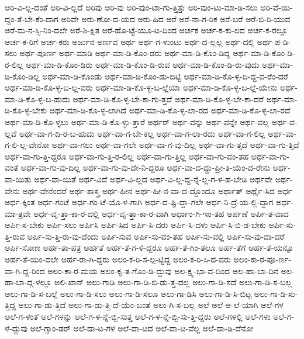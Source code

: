 {ಅರಿ-ವಿ-ಲ್ಲ-ದಂತೆ
ಅರಿ-ವಿ-ಲ್ಲದೆ
ಅರಿವು
ಅರಿ-ವು
ಅರಿ-ವುಂ-ಟಾ-ಗು-ತ್ತಿತ್ತು
ಅರಿ-ವುಂ-ಟು-ಮಾ-ಡಿ-ಸಲು
ಅರಿ-ವೆ-ಯಿ-ದ್ದಂ-ತೆ-ಬೇ-ಕೆಂ-ದಾಗ
ಅರಿವೇ
ಅರು-ಣೋ-ದ-ಯದ
ಅರು-ಹಿದ
ಅರೆ
ಅರೆ-ನಾ-ಗ-ರಿಕ
ಅರೆ-ಬರೆ
ಅರೆ-ಬಿ-ರಿ-ಯುವ
ಅರೆ-ಮ-ನ-ಸ್ಸಿ-ನಿಂ-ದಲೇ
ಅರೆ-ಶಿ-ಕ್ಷಿತ
ಅರೆ-ಹೊ-ಟ್ಟೆ-ಯೂ-ಟ-ದಿಂದ
ಅರ್ಚಕ
ಅರ್ಚ-ಕ-ಕು-ಲದ
ಅರ್ಚ-ಕ-ರಲ್ಲೂ
ಅರ್ಚ-ಕ-ರಿಗೆ
ಅರ್ಚ-ಕರು
ಅರ್ಜುನ
ಅರ್ಣವ
ಅರ್ಥ
ಅರ್ಥ-ಗ-ಳುಂಟು
ಅರ್ಥ-ದ-ಲ್ಲಲ್ಲ
ಅರ್ಥ-ದಲ್ಲಿ
ಅರ್ಥ-ಪ-ಡಿ-ಸಲು
ಅರ್ಥ-ಪೂರ್ಣ
ಅರ್ಥ-ಮಾಡಿ
ಅರ್ಥ-ಮಾ-ಡಿ-ಕೊಂ-ಡರು
ಅರ್ಥ-ಮಾ-ಡಿ-ಕೊಂ-ಡಿದ್ದ
ಅರ್ಥ-ಮಾ-ಡಿ-ಕೊಂ-ಡಿ-ರ-ಲಿಲ್ಲ
ಅರ್ಥ-ಮಾ-ಡಿ-ಕೊಂ-ಡಿರು
ಅರ್ಥ-ಮಾ-ಡಿ-ಕೊಂ-ಡಿ-ರುವ
ಅರ್ಥ-ಮಾ-ಡಿ-ಕೊಂ-ಡಿ-ರು-ವುದು
ಅರ್ಥ-ಮಾ-ಡಿ-ಕೊಂ-ಡಿಲ್ಲ
ಅರ್ಥ-ಮಾ-ಡಿ-ಕೊಂಡು
ಅರ್ಥ-ಮಾ-ಡಿ-ಕೊಂ-ಡು-ಬಿಟ್ಟಿ
ಅರ್ಥ-ಮಾ-ಡಿ-ಕೊ-ಳ್ಳ-ದಿ-ದ್ದ-ವ-ರೆಂ-ದರೆ
ಅರ್ಥ-ಮಾ-ಡಿ-ಕೊ-ಳ್ಳ-ಬ-ಲ್ಲ-ವರು
ಅರ್ಥ-ಮಾ-ಡಿ-ಕೊ-ಳ್ಳ-ಬ-ಲ್ಲೆಯಾ
ಅರ್ಥ-ಮಾ-ಡಿ-ಕೊ-ಳ್ಳ-ಬ-ಲ್ಲೆ-ಯೇನು
ಅರ್ಥ-ಮಾ-ಡಿ-ಕೊ-ಳ್ಳ-ಬ-ಹುದು
ಅರ್ಥ-ಮಾ-ಡಿ-ಕೊ-ಳ್ಳ-ಬೇ-ಕಾ-ಗು-ತ್ತದೆ
ಅರ್ಥ-ಮಾ-ಡಿ-ಕೊ-ಳ್ಳ-ಬೇ-ಕಾ-ದರೆ
ಅರ್ಥ-ಮಾ-ಡಿ-ಕೊ-ಳ್ಳ-ಬೇಕು
ಅರ್ಥ-ಮಾ-ಡಿ-ಕೊ-ಳ್ಳ-ಲಾಗಿದೆ
ಅರ್ಥ-ಮಾ-ಡಿ-ಕೊ-ಳ್ಳ-ಲಾ-ರದ
ಅರ್ಥ-ಮಾ-ಡಿ-ಕೊ-ಳ್ಳ-ಲಾ-ರದೆ
ಅರ್ಥ-ಮಾ-ಡಿ-ಕೊ-ಳ್ಳಲು
ಅರ್ಥ-ಮಾ-ಡಿ-ಕೊ-ಳ್ಳು-ತ್ತಾರೆ
ಅರ್ಥರ್
ಅರ್ಥ-ವನ್ನು
ಅರ್ಥ-ವನ್ನೇ
ಅರ್ಥ-ವಲ್ಲ
ಅರ್ಥ-ವ-ಲ್ಲವೆ
ಅರ್ಥ-ವಾ-ಗ-ದಿ-ರ-ಬ-ಹುದು
ಅರ್ಥ-ವಾ-ಗ-ಬೇ-ಕಲ್ಲ
ಅರ್ಥ-ವಾ-ಗ-ಲಾ-ರದು
ಅರ್ಥ-ವಾ-ಗ-ಲಿಲ್ಲ
ಅರ್ಥ-ವಾ-ಗ-ಲಿ-ಲ್ಲ-ವೇನೋ
ಅರ್ಥ-ವಾ-ಗಲು
ಅರ್ಥ-ವಾ-ಗಲೇ
ಅರ್ಥ-ವಾ-ಗ-ವು-ದಿಲ್ಲ
ಅರ್ಥ-ವಾ-ಗು-ತ್ತದೆ
ಅರ್ಥ-ವಾ-ಗು-ತ್ತಿದೆ
ಅರ್ಥ-ವಾ-ಗು-ತ್ತಿ-ದ್ದರೂ
ಅರ್ಥ-ವಾ-ಗು-ತ್ತಿ-ರ-ಲಿಲ್ಲ
ಅರ್ಥ-ವಾ-ಗು-ತ್ತಿಲ್ಲ
ಅರ್ಥ-ವಾ-ಗು-ವಂ-ತಹ
ಅರ್ಥ-ವಾ-ಗು-ವಂತೆ
ಅರ್ಥ-ವಾ-ಗು-ವು-ದಿಲ್ಲ
ಅರ್ಥ-ವಾ-ಗು-ವು-ದೇ-ನಿ-ದ್ದರೂ
ಅರ್ಥ-ವಾ-ದ-ದ್ದು-ಪ್ರೀ-ತಿ-ಯೆಂ-ದ-ರೇನು
ಅರ್ಥ-ವಾ-ಯಿತು
ಅರ್ಥ-ವಾ-ಯಿತೆ
ಅರ್ಥ-ವಿದೆ
ಅರ್ಥ-ವಿ-ಲ್ಲದ
ಅರ್ಥ-ವಿ-ಲ್ಲ-ದ್ದ-ನ್ನೆ-ಲ್ಲ-ಗ-ಳ-ಹ-ಬೇಡಿ
ಅರ್ಥವೇ
ಅರ್ಥ-ವೇನು
ಅರ್ಥ-ವೇನೆಂದರೆ
ಅರ್ಥ-ಶಾಸ್ತ್ರ
ಅರ್ಥ-ಹೀನ
ಅರ್ಥ-ಹೀ-ನ-ವಾ-ದ-ದ್ದೊಂದೂ
ಅರ್ಥಾತ್
ಅರ್ಥೈ-ಸಿದ
ಅರ್ಧ
ಅರ್ಧ-ಕ್ಕಿಂತ
ಅರ್ಧ-ಗಂಟೆ
ಅರ್ಧ-ಗಂ-ಟೆ-ಯೊ-ಳ-ಗಾಗಿ
ಅರ್ಧ-ದ-ಷ್ಟಿ-ದ್ದಾ-ಗಲೇ
ಅರ್ಧ-ನಿ-ದ್ರೆ-ಯ-ಲ್ಲಿ-ದ್ದಾಗ
ಅರ್ಧ-ಮಾ-ತ್ರವೇ
ಅರ್ಧ-ವೃ-ತ್ತಾ-ಕಾ-ರ-ದಲ್ಲಿ
ಅರ್ಧ-ವೃ-ತ್ತಾ-ಕಾ-ರ-ವಾಗಿ
ಅರ್ಧಾಂ-ಗಿ-ಇಂ-ತಹ
ಅರ್ಪಣೆ
ಅರ್ಪಿ-ತ-ವಾದ
ಅರ್ಪಿ-ಸ-ಬೇಕು
ಅರ್ಪಿ-ಸಲು
ಅರ್ಪಿಸಿ
ಅರ್ಪಿ-ಸಿದ
ಅರ್ಪಿ-ಸಿ-ದರು
ಅರ್ಪಿ-ಸಿ-ದಳು
ಅರ್ಪಿ-ಸಿ-ಬಿ-ಡ-ಬೇಕು
ಅರ್ಪಿ-ಸು-ತ್ತಿ-ರುವ
ಅರ್ಪಿ-ಸು-ತ್ತಿ-ರು-ವು-ದೆಂದು
ಅರ್ಪಿ-ಸುವ
ಅರ್ಪಿ-ಸು-ವಂ-ತಹ
ಅರ್ಪಿ-ಸು-ವಲ್ಲಿ
ಅರ್ಪಿ-ಸು-ವು-ದಾ-ದರೆ
ಅರ್ಪಿ-ಸೋಣ
ಅರ್ಹ-ತಾ-ಪತ್ರ
ಅರ್ಹತೆ
ಅರ್ಹ-ತೆ-ಗ-ಳಿ-ದ್ದರೂ
ಅರ್ಹ-ತೆ-ಗಿಂ-ತಲೂ
ಅರ್ಹ-ತೆಗೆ
ಅರ್ಹ-ತೆ-ಯನ್ನೂ
ಅರ್ಹ-ತೆ-ಯಿಂ-ದಲೇ
ಅರ್ಹ-ರಾ-ಗಿ-ದ್ದರು
ಅಲಂ-ಕ-ರಿ-ಸ-ಲ್ಪ-ಟ್ಟಿದ್ದ
ಅಲಂ-ಕ-ರಿ-ಸಿ-ದ-ವರು
ಅಲಂ-ಕಾ-ರ-ಪೂ-ರ್ಣ-ವಾ-ಗಿ-ದ್ದ-ರಿಂದ
ಅಲಂ-ಕಾ-ರ-ಮಯ
ಅಲಂ-ಕೃ-ತ-ಗೊಂ-ಡಿ-ದ್ದುವು
ಅಲ-ಕ್ಷ್ಯ-ಭಾ-ವ-ದಿಂದ
ಅಲ-ಹಾ-ಬಾ-ದಿನ
ಅಲ-ಹಾ-ಬಾ-ದ್ಗ-ಳಲ್ಲೂ
ಅಲಿ-ಖಾನ್
ಅಲು-ಗಾಡಿ
ಅಲು-ಗಾ-ಡಿ-ಬಿ-ಡು-ತ್ತ-ದಲ್ಲ
ಅಲು-ಗಾ-ಡಿ-ಸದೆ
ಅಲು-ಗಾ-ಡಿ-ಸ-ಬಲ್ಲ
ಅಲು-ಗಾ-ಡಿ-ಸ-ಬಲ್ಲೆ
ಅಲು-ಗಾ-ಡಿ-ಸಲು
ಅಲು-ಗಾ-ಡಿ-ಸಲೂ
ಅಲು-ಗಾ-ಡಿಸಿ
ಅಲು-ಗಾ-ಡಿ-ಸಿ-ಬಿಟ್ಟ
ಅಲು-ಗಾ-ಡಿ-ಸು-ತ್ತಿದ್ದ
ಅಲು-ಗಾ-ಡು-ತ್ತಿದೆ
ಅಲು-ಗಾ-ಡು-ತ್ತಿ-ದೆ-ಯೆಂ-ಬಂತೆ
ಅಲು-ಗಿ-ಸ-ಬಲ್ಲ
ಅಲೆ
ಅಲೆ-ಅ-ಲೆ-ಯಾಗಿ
ಅಲೆ-ಗಳ
ಅಲೆ-ಗ-ಳಂತೆ
ಅಲೆ-ಗಳನ್ನು
ಅಲೆ-ಗ-ಳ-ನ್ನೆ-ಬ್ಬಿ-ಸುತ್ತ
ಅಲೆ-ಗ-ಳ-ನ್ನೆ-ಬ್ಬಿ-ಸು-ತ್ತಿ-ದ್ದರು
ಅಲೆ-ಗಳಲ್ಲಿ
ಅಲೆ-ಗಳು
ಅಲೆ-ಗ-ಳೆ-ದ್ದುವು
ಅಲೆ-ಗ್ಸಾಂ-ಡರ್
ಅಲೆ-ದಾ-ಟ-ಗಳ
ಅಲೆ-ದಾ-ಟದ
ಅಲೆ-ದಾ-ಟ-ವೆಲ್ಲ
ಅಲೆ-ದಾ-ಡಿ-ದೆನೋ
}

